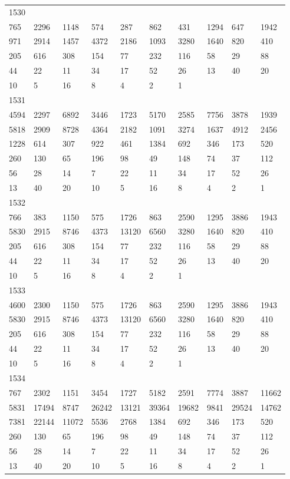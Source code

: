 \begin{longtable}{*{10}{l}}
1530&&&&&&&&&\\
765& 2296& 1148& 574& 287& 862& 431& 1294& 647& 1942\\
971& 2914& 1457& 4372& 2186& 1093& 3280& 1640& 820& 410\\
205& 616& 308& 154& 77& 232& 116& 58& 29& 88\\
44& 22& 11& 34& 17& 52& 26& 13& 40& 20\\
10& 5& 16& 8& 4& 2& 1& \\

1531&&&&&&&&&\\
4594& 2297& 6892& 3446& 1723& 5170& 2585& 7756& 3878& 1939\\
5818& 2909& 8728& 4364& 2182& 1091& 3274& 1637& 4912& 2456\\
1228& 614& 307& 922& 461& 1384& 692& 346& 173& 520\\
260& 130& 65& 196& 98& 49& 148& 74& 37& 112\\
56& 28& 14& 7& 22& 11& 34& 17& 52& 26\\
13& 40& 20& 10& 5& 16& 8& 4& 2& 1\\

1532&&&&&&&&&\\
766& 383& 1150& 575& 1726& 863& 2590& 1295& 3886& 1943\\
5830& 2915& 8746& 4373& 13120& 6560& 3280& 1640& 820& 410\\
205& 616& 308& 154& 77& 232& 116& 58& 29& 88\\
44& 22& 11& 34& 17& 52& 26& 13& 40& 20\\
10& 5& 16& 8& 4& 2& 1& \\

1533&&&&&&&&&\\
4600& 2300& 1150& 575& 1726& 863& 2590& 1295& 3886& 1943\\
5830& 2915& 8746& 4373& 13120& 6560& 3280& 1640& 820& 410\\
205& 616& 308& 154& 77& 232& 116& 58& 29& 88\\
44& 22& 11& 34& 17& 52& 26& 13& 40& 20\\
10& 5& 16& 8& 4& 2& 1& \\

1534&&&&&&&&&\\
767& 2302& 1151& 3454& 1727& 5182& 2591& 7774& 3887& 11662\\
5831& 17494& 8747& 26242& 13121& 39364& 19682& 9841& 29524& 14762\\
7381& 22144& 11072& 5536& 2768& 1384& 692& 346& 173& 520\\
260& 130& 65& 196& 98& 49& 148& 74& 37& 112\\
56& 28& 14& 7& 22& 11& 34& 17& 52& 26\\
13& 40& 20& 10& 5& 16& 8& 4& 2& 1\\


\end{longtable}
